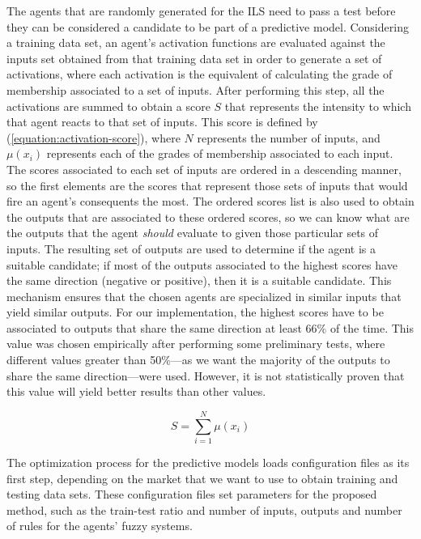 \documentclass{ieeeaccess}
\begin{document}
The agents that are randomly generated for the ILS need to
pass a test before they can be considered a candidate to be part of a
predictive model. Considering a training data set, an agent's
activation functions are evaluated against the inputs set obtained
from that training data set in order to generate a set of activations,
where each activation is the equivalent of calculating the grade of
membership associated to a set of inputs. After performing this step,
all the activations are summed to obtain a score $S$ that represents
the intensity to which that agent reacts to that set of inputs. This
score is defined by (\ref{equation:activation-score}), where $N$
represents the number of inputs, and $\mu(x_{i})$ represents each of
the grades of membership associated to each input. The scores
associated to each set of inputs are ordered in a descending manner,
so the first elements are the scores that represent those sets of
inputs that would fire an agent's consequents the most. The ordered
scores list is also used to obtain the outputs that are associated to
these ordered scores, so we can know what are the outputs that the
agent \textit{should} evaluate to given those particular sets of
inputs. The resulting set of outputs are used to determine if the
agent is a suitable candidate; if most of the outputs associated to
the highest scores have the same direction (negative or positive),
then it is a suitable candidate. This mechanism ensures that the
chosen agents are specialized in similar inputs that yield similar
outputs. For our implementation, the highest scores have to be
associated to outputs that share the same direction at least 66\% of
the time. This value was chosen empirically after performing some
preliminary tests, where different values greater than 50\%---as we
want the majority of the outputs to share the same direction---were
used. However, it is not statistically proven that this value will
yield better results than other values.

\begin{equation}
  \label{equation:activation-score}
  S =\sum_{i=1}^{N}{\mu(x_{i})}
\end{equation}

The optimization process for the predictive models loads configuration
files as its first step, depending on the market that we want to use
to obtain training and testing data sets. These configuration files
set parameters for the proposed method, such as the train-test ratio
and number of inputs, outputs and number of rules for the agents'
fuzzy systems.
\end{document}
